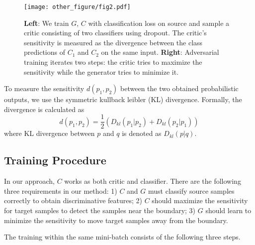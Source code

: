\documentclass{article} \usepackage{iclr2018_conference,times}
\begin{document}
\begin{figure}[t]
  \begin{center}
\texttt{[image: other\_figure/fig2.pdf]}
  \end{center}
  \vspace{-3mm}
  \caption{ {\small }{\bf Left}: We train $G$, $C$ with classification loss on source and sample a critic consisting of two classifiers using dropout. The critic's sensitivity is measured as the divergence between the class predictions of $C_1$ and $C_2$ on the same input. {\bf Right}: Adversarial training iterates two steps: the critic tries to maximize the sensitivity while the generator tries to minimize it.}
  \label{fig:method_overview}
  \end{figure}

To measure the sensitivity $d(p_1,p_2)$ between the two obtained  probabilistic outputs, we use the symmetric kullback leibler (KL) divergence. Formally, the divergence is calculated as
\begin{equation}
d(p_1,p_2) =  \frac{1}{2}(D_{kl}(p_1|p_2)+D_{kl}(p_2|p_1))
\label{eq:distance}
\end{equation}
where KL divergence between $p$ and $q$ is denoted as $D_{kl}(p|q)$. 

\subsection{Training Procedure}\label{sec:procedure}
\vspace{-3mm}        
In our approach, $C$ works as both critic and classifier. 
There are the following three requirements in our method:
1) $C$ and $G$ must classify source samples correctly to obtain discriminative features; 2) $C$ should maximize the sensitivity for target samples to detect the samples near the boundary; 3) $G$ should learn to minimize the sensitivity to move target samples away from the boundary.

The training within the same mini-batch consists of the following three steps.
\end{document}
